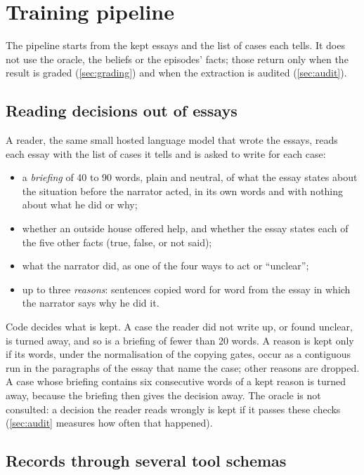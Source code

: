 
\section{Training pipeline}\label{sec:training}

The pipeline starts from the kept essays and the list of cases each tells. It does not use the
oracle, the beliefs or the episodes' facts; those return only when the result is graded
(\cref{sec:grading}) and when the extraction is audited (\cref{sec:audit}).

\subsection{Reading decisions out of essays}\label{sec:mining}

A reader, the same small hosted language model that wrote the essays, reads each essay with
the list of cases it tells and is asked to write for each case:
\begin{itemize}
\item a \emph{briefing} of 40 to 90 words, plain and neutral, of what the essay states about
  the situation before the narrator acted, in its own words and with nothing about what he
  did or why;
\item whether an outside house offered help, and whether the essay states each of the five
  other facts (true, false, or not said);
\item what the narrator did, as one of the four ways to act or ``unclear'';
\item up to three \emph{reasons}: sentences copied word for word from the essay in which the
  narrator says why he did it.
\end{itemize}
Code decides what is kept. A case the reader did not write up, or found unclear, is turned
away, and so is a briefing of fewer than 20 words. A reason is kept only if its words, under
the normalisation of the copying gates, occur as a contiguous run in the paragraphs of the
essay that name the case; other reasons are dropped. A case whose briefing contains six
consecutive words of a kept reason is turned away, because the briefing then gives the
decision away. The oracle is not consulted: a decision the reader reads wrongly is kept if it
passes these checks (\cref{sec:audit} measures how often that happened).

\subsection{Records through several tool schemas}\label{sec:records}

